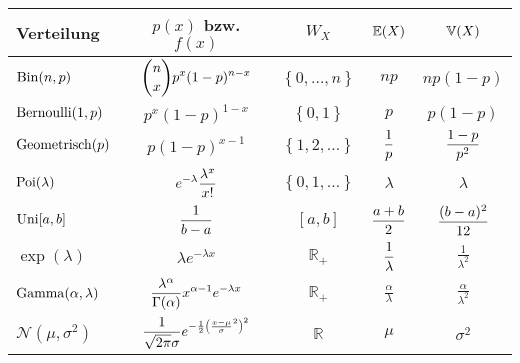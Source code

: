 \begin{tabular}[]{lcccc}
	\toprule
	Verteilung&$p(x)$ bzw. $f(x)$&$W_{X}$&$\operatorname{\mathbb E}(X)$&$\operatorname{\mathbb V}(X)$\\
	\midrule
	$\operatorname{Bin}(n,p)$&$\displaystyle{n\choose x}p^{x}(1-p)^{n-x}$&$\left\{ 0,\ldots,n \right\}$&$np$&$np\left( 1-p \right)$\\
	$\operatorname{Bernoulli}(1,p)$&$p^{x}(1-p)^{1-x}$&$\left\{ 0,1 \right\}$&$p$&$p\left( 1-p \right)$\\[1em]
	$\operatorname{Geometrisch}(p)$&$p(1-p)^{x-1}$&$\left\{ 1,2,\ldots \right\}$&$\displaystyle\frac{1}{p}$&$\displaystyle\frac{1-p}{p^2}$\\
	$\operatorname{Poi}(\lambda)$&$\displaystyle e^{-\lambda}\frac{\lambda^x}{x!}$&$\left\{ 0,1,\ldots \right\}$&$\lambda$&$\lambda$\\
	$\operatorname{Uni}[a,b]$&$\displaystyle\frac{1}{b-a}$&$[a,b]$&$\displaystyle\frac{a+b}{2}$&$\displaystyle \frac{(b-a)^2}{12}$\\[1em]
	$\exp(\lambda)$&$\lambda e^{-\lambda x}$& $\mathbb{R}_{+}$&$\displaystyle \frac{1}{\lambda}$&$\frac{1}{\lambda^2}$\\
	$\operatorname{Gamma}(\alpha,\lambda)$&$\displaystyle \frac{\lambda^{\alpha}}{\Gamma(\alpha)}x^{\alpha-1}e^{-\lambda x}$&$\mathbb{R}_{+}$&$\frac{\alpha}{\lambda}$&$\frac{\alpha}{\lambda^2}$\\
	$\mathcal{N}(\mu,\sigma^2)$&$\displaystyle \frac{1}{\sqrt{2\pi}\sigma}e^{-\frac{1}{2}\left(\frac{x-\mu}{\sigma}^2 \right)^2}$&$\mathbb{R}$&$\mu$&$\sigma^2$\\
	\bottomrule
\end{tabular}
